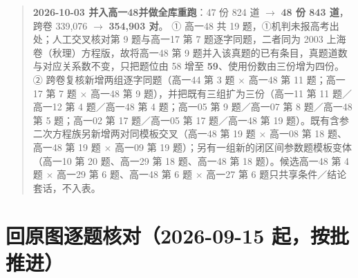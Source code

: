 \documentclass[a4paper,11pt]{article}
\begin{document}
\begin{quote}
\textbf{2026-10-03 并入高一48并做全库重跑}：47 份 824 道 $\to$ \textbf{48 份 843 道}，跨卷 339,076 $\to$ \textbf{354,903 对}。
① 高一48 共 19 题，①机判未报高考出处；人工交叉核对第 9 题与高一17 第 7 题逐字同题，二者同为 2003 上海卷（秋理）方程版，故将高一48 第 9 题并入该真题的已有条目，真题道数与对应关系数不变，只把题位由 58 增至 \textbf{59}、使用份数由三份增为四份。
② 跨卷复核新增两组逐字同题（高一44 第 3 题 $\times$ 高一48 第 11 题；高一17 第 7 题 $\times$ 高一48 第 9 题），并把既有三组扩为三份（高一11 第 11 题／高一12 第 4 题／高一48 第 4 题；高一05 第 9 题／高一07 第 8 题／高一48 第 5 题；高一02 第 17 题／高一05 第 17 题／高一48 第 19 题）。既有含参二次方程族另新增两对同模板交叉（高一48 第 19 题 $\times$ 高一08 第 18 题、高一48 第 19 题 $\times$ 高一09 第 19 题）；另有一组新的闭区间参数题模板变体（高一10 第 20 题、高一29 第 18 题、高一48 第 18 题）。候选高一48 第 4 题 $\times$ 高一29 第 6 题、高一48 第 6 题 $\times$ 高一27 第 6 题只共享条件／结论套话，不入表。
\end{quote}

\clearpage
\section{回原图逐题核对（2026-09-15 起，按批推进）}
\end{document}

